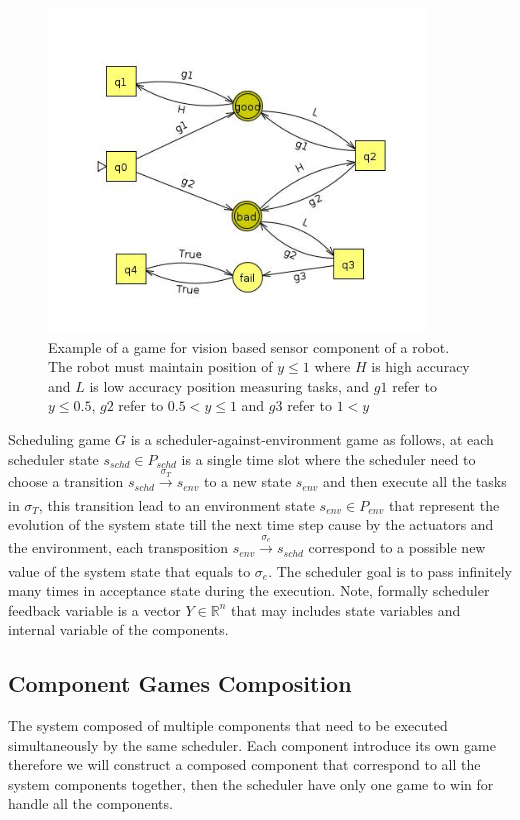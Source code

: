 \documentclass[ twoside, 12pt ]{article}
\newcommand\R{{\mathbb R}}
\begin{document}
\begin{figure} %
    \centerline{\includegraphics[width=100mm]{gameExample.jpg}}
    \caption{Example of a game for vision based sensor component of a robot.
        The robot must maintain position of $y \le 1$ where $H$ is high accuracy and $L$ is low accuracy position measuring tasks, and
        $g1$ refer to $y \le 0.5$, $g2$ refer to $0.5 < y \le 1$ and $g3$ refer to $1 < y$ }
    \label{fig:exampleGame}
\end{figure}

Scheduling game $G$ is a scheduler-against-environment game as follows, at each scheduler state $s_{schd} \in P_{schd}$ is a single time slot where the scheduler need to choose a transition $s_{schd} \xrightarrow[]{\sigma_{T}} s_{env}$ to a new state $s_{env}$ and then execute all the tasks in $\sigma_{T}$, this transition lead to an environment state $s_{env} \in P_{env}$ that represent the evolution of the system state till the next time step cause by the actuators and the environment, each transposition $s_{env} \xrightarrow[]{\sigma_{e}} s_{schd}$ correspond to a possible new value of the system state that equals to $\sigma_{e}$.
The scheduler goal is to pass infinitely many times in acceptance state during the execution.
Note, formally scheduler feedback variable is a vector $Y \in \R^n$ that may includes state variables and internal variable of the components.

\subsection{Component Games Composition}
The system composed of multiple components that need to be executed simultaneously by the same scheduler.
Each component introduce its own game therefore we will construct a composed component that correspond to all the system components together, then the scheduler have only one game to win for handle all the components.
\end{document}
